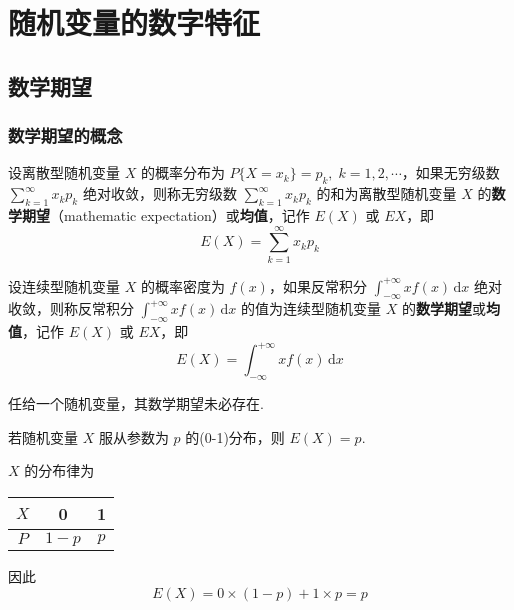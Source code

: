 \chapter{随机变量的数字特征}

\section{数学期望}

\subsection{数学期望的概念}

\begin{definition}
    设离散型随机变量 $X$ 的概率分布为 $P\{X=x_k\} = p_k, \; k=1,2,\cdots$，如果无穷级数 $\displaystyle\sum_{k=1}^{\infty} x_k p_k$ 绝对收敛，则称无穷级数 $\displaystyle\sum_{k=1}^{\infty} x_k p_k$ 的和为离散型随机变量 $X$ 的\textbf{数学期望}（mathematic expectation）或\textbf{均值}，记作 $E(X)$ 或 $EX$，即
    $$
    E(X) = \sum_{k=1}^{\infty} x_k p_k
    $$

    设连续型随机变量 $X$ 的概率密度为 $f(x)$，如果反常积分 $\displaystyle\int_{-\infty}^{+\infty} x f(x) \, \text{d}x$ 绝对收敛，则称反常积分 $\displaystyle\int_{-\infty}^{+\infty} x f(x) \, \text{d}x$ 的值为连续型随机变量 $X$ 的\textbf{数学期望}或\textbf{均值}，记作 $E(X)$ 或 $EX$，即
    $$
    E(X) = \int_{-\infty}^{+\infty} x f(x) \, \text{d}x
    $$
\end{definition}

任给一个随机变量，其数学期望未必存在.

\begin{conclusion}
    若随机变量 $X$ 服从参数为 $p$ 的(0-1)分布，则 $E(X) = p$.
\end{conclusion}

\begin{myproof}
    $X$ 的分布律为

    \begin{center}
        \begin{tabular}{c | c c}
            \hline
            $X$ & 0 & 1 \\
            \hline
            $P$ & $1-p$ & $p$ \\
            \hline
        \end{tabular}
    \end{center}

    因此
    $$
    E(X) = 0 \times (1-p) + 1 \times p = p
    $$
\end{myproof}

